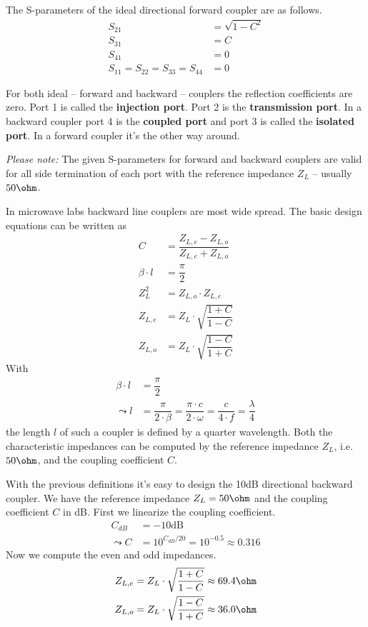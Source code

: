 The S-parameters of the ideal directional forward coupler are as
follows.
\begin{align*}
S_{21} &= \sqrt{1 - C^2}\\
S_{31} &= C\\
S_{41} &= 0\\
S_{11} = S_{22} = S_{33} = S_{44} &= 0
\end{align*}

For both ideal -- forward and backward -- couplers the reflection
coefficients are zero.  Port 1 is called the \textbf{injection port}.
Port 2 is the \textbf{transmission port}.  In a backward coupler port
4 is the \textbf{coupled port} and port 3 is called the
\textbf{isolated port}.  In a forward coupler it's the other way
around.

\addvspace{12pt}

\textit{Please note:} The given S-parameters for forward and backward
couplers are valid for all side termination of each port with the
reference impedance $Z_L$ -- usually $50\ohm$.


In microwave labs backward line couplers are most wide spread.  The
basic design equations can be written as
\begin{align*}
C &= \dfrac{Z_{L,e} - Z_{L,o}}{Z_{L,e} + Z_{L,o}}\\
\beta\cdot l &= \dfrac{\pi}{2}\\
Z_L^2 &= Z_{L,o}\cdot Z_{L,e}\\
Z_{L,e} &= Z_L\cdot\sqrt{\dfrac{1 + C}{1 - C}}\\
Z_{L,o} &= Z_L\cdot\sqrt{\dfrac{1 - C}{1 + C}}
\end{align*}
With
\begin{align*}
\beta\cdot l &= \dfrac{\pi}{2}\\
\leadsto l &= \dfrac{\pi}{2\cdot \beta} = \dfrac{\pi\cdot c}{2\cdot \omega} = \dfrac{c}{4\cdot f} = \dfrac{\lambda}{4}
\end{align*}
the length $l$ of such a coupler is defined by a quarter wavelength.
Both the characteristic impedances can be computed by the reference
impedance $Z_L$, i.e. $50\ohm$, and the coupling coefficient $C$.


With the previous definitions it's easy to design the 10dB directional
backward coupler.  We have the reference impedance $Z_L = 50\ohm$ and
the coupling coefficient $C$ in dB.  First we linearize the coupling
coefficient.
\begin{align*}
C_{dB} &= -10\textrm{dB}\\
\leadsto C &= 10^{C_{dB} / 20} = 10^{-0.5} \approx 0.316
\end{align*}
Now we compute the even and odd impedances.
\begin{align*}
Z_{L,e} &= Z_L\cdot\sqrt{\dfrac{1 + C}{1 - C}} \approx 69.4\ohm\\
Z_{L,o} &= Z_L\cdot\sqrt{\dfrac{1 - C}{1 + C}} \approx 36.0\ohm
\end{align*}

